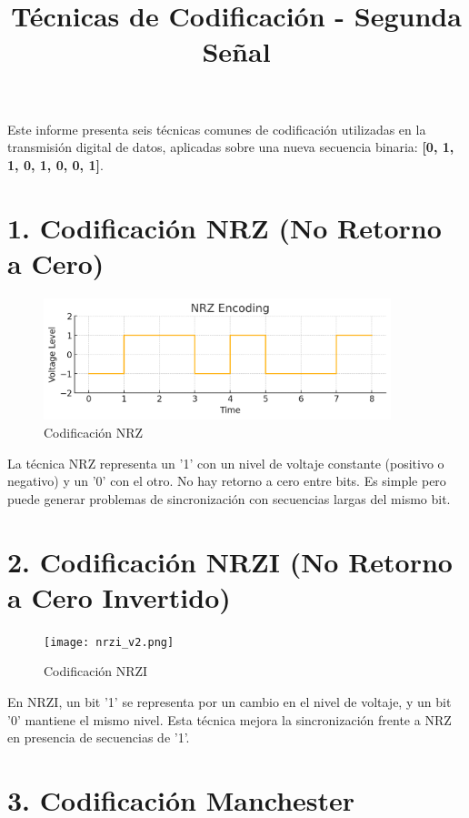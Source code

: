 \documentclass[a4paper,12pt]{article}
\title{Técnicas de Codificación - Segunda Señal}
\author{}
\date{}
\begin{document}
\maketitle

Este informe presenta seis técnicas comunes de codificación utilizadas en la transmisión digital de datos, aplicadas sobre una nueva secuencia binaria: \textbf{[0, 1, 1, 0, 1, 0, 0, 1]}.

\section*{1. Codificación NRZ (No Retorno a Cero)}

\begin{figure}[h!]
\centering
\includegraphics[width=0.9\textwidth]{nrz_v2.png}
\caption{Codificación NRZ}
\end{figure}

La técnica NRZ representa un '1' con un nivel de voltaje constante (positivo o negativo) y un '0' con el otro. No hay retorno a cero entre bits. Es simple pero puede generar problemas de sincronización con secuencias largas del mismo bit.

\clearpage

\section*{2. Codificación NRZI (No Retorno a Cero Invertido)}

\begin{figure}[h!]
\centering
\texttt{[image: nrzi\_v2.png]}
\caption{Codificación NRZI}
\end{figure}

En NRZI, un bit '1' se representa por un cambio en el nivel de voltaje, y un bit '0' mantiene el mismo nivel. Esta técnica mejora la sincronización frente a NRZ en presencia de secuencias de '1'.

\clearpage

\section*{3. Codificación Manchester}
\end{document}
